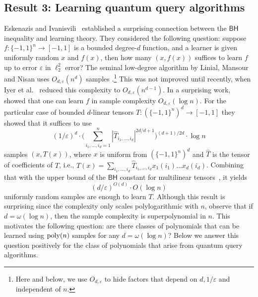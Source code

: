 \documentclass[11pt]{article}
\newcommand{\eps}{\varepsilon}
\newcommand{\BH}{\textsf{BH}}
\theoremstyle{plain}
\newcommand{\pmset}[1]{\{-1,1\}^{#1}} %
\newcommand{\poly}{\mbox{\rm poly}}
\theoremstyle{plain}
\theoremstyle{definition}
\theoremstyle{remark}
\theoremstyle{named}
\begin{document}
\subsection{Result 3: Learning quantum query algorithms}
Eskenazis and Ivanisvili~\cite{eskenazis2022learning} established a surprising connection between the $\BH$ inequality and learning theory. They considered the following question: suppose $f:\pmset{n}\rightarrow [-1,1]$ is a bounded degree-$d$ function, and a learner is given uniformly random $x$ and $f(x)$, then how many $(x,f(x))$ suffices to learn $f$ up to error $\eps$ in $\ell_2^2$ error? The seminal low-degree algorithm by Linial, Mansour and Nisan uses $O_{d,\eps}(n^d)$ samples \cite{linial1993constant}.\footnote{Here and below, we use $O_{d,\varepsilon}$ to hide factors that depend on  $d,1/\varepsilon$ and independent of $n$.}  This was not improved until recently, when Iyer et al.~\cite{iyer2021tight} reduced this complexity to $O_{d,\eps}(n^{d-1})$. In a surprising work,~\cite{eskenazis2022learning} showed that one can learn $f$ in sample complexity $O_{d,\eps}(\log n)$. For the particular case of bounded $d$-linear tensors $T:(\{-1,1\}^n)^d\to [-1,1]$ they showed that it suffices to use 
\begin{equation}\label{eq:eskenazis2d/d+1}
    (1/\varepsilon)^d\cdot\Big(\sum_{i_1,\ldots,i_d=1}^n |\widehat T_{i_1,\ldots,i_d}|^{2d/d+1}\Big)^{(d+1)/2d}\cdot \log n
\end{equation}
samples $(x,T(x))$, where $x$ is uniform from $(\{-1,1\}^n)^d$ and $\widehat T$ is the tensor of coefficients of $T$, i.e., $T(x)=\sum_{i_1,\dots,i_d}\widehat T_{i_1,\dots,i_d}x_1(i_1)\dots x_d(i_d)$. Combining that with the upper bound of the $\BH$ constant for multilinear tensors~\cite{bayart2014bohr}, it yields
\begin{equation}\label{eq:eskenazisbounded}
    (d/\eps)^{O(d)}\cdot O(\log n)
\end{equation}
uniformly random samples are enough to learn $T$. Although this result is surprising since the complexity only scales polylogarithmic with $n$, observe that if $d=\omega(\log n)$, then the sample complexity is superpolynomial in $n$. This motivates the following question: are there classes of polynomials that can be learned using $\poly(n)$ samples for any $d=\omega(\log n)$? Below we answer this question positively for the class of polynomials that arise from quantum query algorithms.
\end{document}
